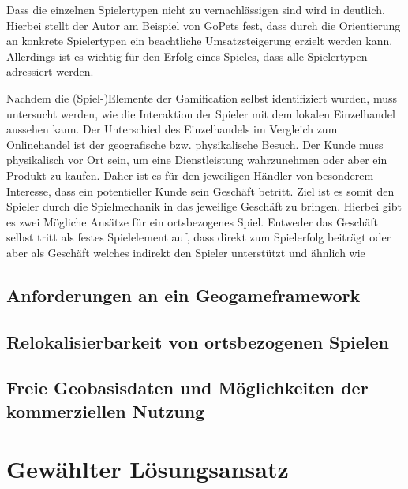 Dass die einzelnen Spielertypen nicht zu vernachlässigen sind wird in \cite{Bromley.2013} deutlich. Hierbei stellt der Autor am Beispiel von GoPets fest, dass durch die Orientierung an konkrete Spielertypen ein beachtliche Umsatzsteigerung erzielt werden kann. \cite{Bethke.2007} Allerdings ist es wichtig für den Erfolg eines Spieles, dass alle Spielertypen adressiert werden.


Nachdem die (Spiel-)Elemente der Gamification selbst identifiziert wurden, muss untersucht werden, wie die Interaktion der Spieler mit dem lokalen Einzelhandel aussehen kann.
Der Unterschied des Einzelhandels im Vergleich zum Onlinehandel ist der geografische bzw. physikalische Besuch. Der Kunde muss physikalisch vor Ort sein, um eine Dienstleistung wahrzunehmen oder aber ein Produkt zu kaufen. Daher ist es für den jeweiligen Händler von besonderem Interesse, dass ein potentieller Kunde sein Geschäft betritt.
Ziel ist es somit den Spieler durch die Spielmechanik in das jeweilige Geschäft zu bringen.
Hierbei gibt es zwei Mögliche Ansätze für ein ortsbezogenes Spiel. Entweder das Geschäft selbst tritt als festes Spielelement auf, dass direkt zum Spielerfolg beiträgt oder aber als Geschäft welches indirekt den Spieler unterstützt und ähnlich wie 



%
\subsection*{Anforderungen an ein Geogameframework}

\subsection*{Relokalisierbarkeit von ortsbezogenen Spielen}

\subsection*{Freie Geobasisdaten und Möglichkeiten der kommerziellen Nutzung}

\section{Gewählter Lösungsansatz}


